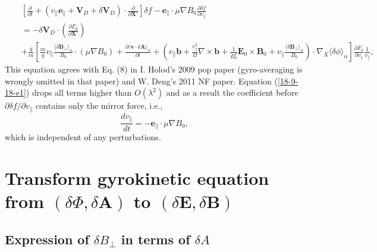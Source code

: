 \documentclass{article}
\begin{document}
\begin{eqnarray}
  &  & \left[ \frac{\partial}{\partial t} + (v_{\parallel}
  \mathbf{e}_{\parallel} +\mathbf{V}_D + \delta \mathbf{V}_D) \cdot
  \frac{\partial}{\partial \mathbf{X}'} \right] \delta f
  -\mathbf{e}_{\parallel} \cdot \mu \nabla B_0 \frac{\partial \delta
  f}{\partial v_{\parallel}} \nonumber\\
  &  & = - \delta \mathbf{V}_D \cdot \left( \frac{\partial F_0}{\partial
  \mathbf{X}'} \right) \nonumber\\
  &  & + \frac{q}{m} \left[ \frac{m}{q} v_{\parallel} \frac{\langle \delta
  \mathbf{B}_{\perp} \rangle_{\alpha}}{B_0} \cdot (\mu \nabla B_0) +
  \frac{\partial \langle \mathbf{v} \cdot \delta \mathbf{A}
  \rangle_{\alpha}}{\partial t} + \left( v_{\parallel} \mathbf{b}+
  \frac{v_{\parallel}^2}{\Omega} \nabla \times \mathbf{b}+ \frac{1}{B_0^2}
  \mathbf{E}_0 \times \mathbf{B}_0 + v_{\parallel} \frac{\langle \delta
  \mathbf{B}_{\perp} \rangle_{\alpha}}{B_0} \right) \cdot \nabla_X \langle
  \delta \phi \rangle_{\alpha} \right] \frac{\partial F_0}{\partial
  v_{\parallel}}  \frac{1}{v_{\parallel}},  \label{18-9-18-e1}
\end{eqnarray}
This equation agrees with Eq. (8) in I. Holod's 2009 pop paper (gyro-averaging
is wrongly omitted in that paper) and W. Deng's 2011 NF paper. Equation
(\ref{18-9-18-e1}) drops all terms higher than $O (\lambda^2)$ and as a result
the coefficient before $\partial \delta f / \partial v_{\parallel}$ contains
only the mirror force, i.e.,
\begin{equation}
  \frac{d v_{\parallel}}{d t} = -\mathbf{e}_{\parallel} \cdot \mu \nabla B_0,
\end{equation}
which is independent of any perturbations.

\section{Transform gyrokinetic equation from $(\delta \Phi, \delta
\mathbf{A})$ to $(\delta \mathbf{E}, \delta \mathbf{B})$}

\subsection{Expression of $\delta B_{\perp}$ in terms of $\delta A$}
\end{document}
